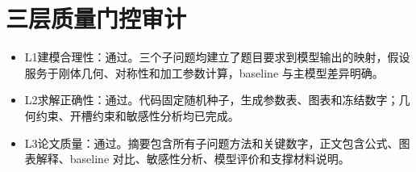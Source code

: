 \documentclass[UTF8,a4paper,12pt]{ctexart}
\begin{document}
\section{三层质量门控审计}
\begin{itemize}
\item L1建模合理性：通过。三个子问题均建立了题目要求到模型输出的映射，假设服务于刚体几何、对称性和加工参数计算，baseline 与主模型差异明确。
\item L2求解正确性：通过。代码固定随机种子，生成参数表、图表和冻结数字；几何约束、开槽约束和敏感性分析均已完成。
\item L3论文质量：通过。摘要包含所有子问题方法和关键数字，正文包含公式、图表解释、baseline 对比、敏感性分析、模型评价和支撑材料说明。
\end{itemize}
\end{document}
